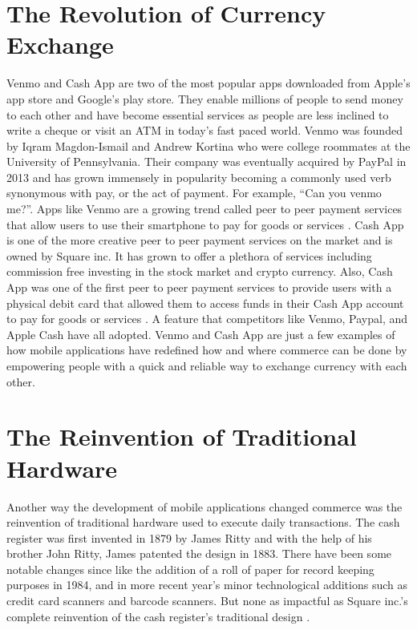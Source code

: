 \documentclass{article}
\begin{document}
\section{The Revolution of Currency Exchange}
Venmo and Cash App are two of the most popular apps downloaded from Apple's app store and Google's play store. They enable millions of people to send money to each other and have become essential services as people are less inclined to write a cheque or visit an ATM in today's fast paced world. Venmo was founded by Iqram Magdon-Ismail and Andrew Kortina who were college roommates at the University of Pennsylvania. Their company was eventually acquired by PayPal in 2013 and has grown immensely in popularity becoming a commonly used verb synonymous with pay, or the act of payment. For example, “Can you venmo me?”.  Apps like Venmo are a growing trend called peer to peer payment services that allow users to use their smartphone to pay for goods or services
\cite{bloomenthal_2020}. Cash App is one of the more creative peer to peer payment services on the market and is owned by Square inc. It has grown to offer a plethora of services including commission free investing in the stock market and crypto currency. Also, Cash App was one of the first peer to peer payment services to provide users with a physical debit card that allowed them to access funds in their Cash App account to pay for goods or services \cite{eckstein_2020}. A feature that competitors like Venmo, Paypal, and Apple Cash have all adopted. Venmo and Cash App are just a few examples of how mobile applications have redefined how and where commerce can be done by empowering people with a quick and reliable way to exchange currency with each other.

\section{The Reinvention of Traditional Hardware}
Another way the development of mobile applications changed commerce was the reinvention of traditional hardware used to execute daily transactions. The cash register was first invented in 1879 by James Ritty and with the help of his brother John Ritty, James patented the design in 1883. There have been some notable changes since like the addition of a roll of paper for record keeping purposes in 1984, and in more recent year’s minor technological additions such as credit card scanners and barcode scanners. But none as impactful as Square inc.’s complete reinvention of the cash register’s traditional design \cite{sorensen_2019}.
\end{document}
